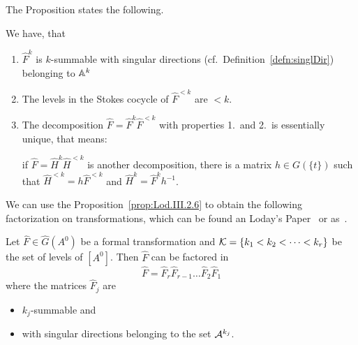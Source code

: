 The Proposition \cite[Prop.III.2.6]{Loday1994} states the following.
\begin{prop}\label{prop:Lod.III.2.6}
  We have, that
  \begin{enumerate}
    \item $\hat F^k$ is $k$-summable with singular directions
      (cf.\ Definition~\ref{defn:singlDir}) belonging to
      $\mathbb{A}^k$
    \item The levels in the Stokes cocycle of $\hat F^{<k}$ are $<k$.
    \item The decomposition $\hat F=\hat F^{k}\hat F^{<k}$ with properties 1.\
      and 2.\ is essentially unique, that means:
      \begin{einr}
        if $\hat F=\hat H^k\hat H^{<k}$ is another decomposition, there is a
        matrix $h\in G(\!\{t\}\!)$ such that $\hat H^{<k}=h\hat F^{<k}$ and
        $\hat H^{k}=\hat F^{k}h^{-1}$.
      \end{einr}
  \end{enumerate}
\end{prop}
\begin{comment}
  \begin{proof}
    The first property \PROBLEM

    The property 2.\ is clear, \rewrite{since larger levels would require more
    singular directions}.

    The property 3.\ results from the fact that we must have
    \[
      \exp_{A^0}(\hat H^{<k})=\exp_{A^0}(\hat F^{<k}).
    \]
  \end{proof}
\end{comment}
We can use the Proposition~\ref{prop:Lod.III.2.6} to obtain the following
factorization on transformations, which can be found an Loday's
Paper~\cite[Thm.III.2.5]{Loday1994} or as~\cite[Thm.4.7]{Martinet1991}.
\begin{thm}\label{thm:summaFaktori}
  Let $\hat F\in\hat G(A^0)$ be a formal transformation and
  $\mathcal{K}=\{k_1<k_2<\cdots<k_r\}$ be the set of levels of $[A^0]$. Then $\hat F$
  can be factored in
  \[
    \hat F=\hat F_r\hat F_{r-1}\dots\hat F_2\hat F_1
  \]
  where the matrices $\hat F_j$ are
  \begin{itemize}
    \item $k_j$-summable and
    \item with singular directions belonging to the set $\mathcal{A}^{k_j}$.
  \end{itemize}
\end{thm}


